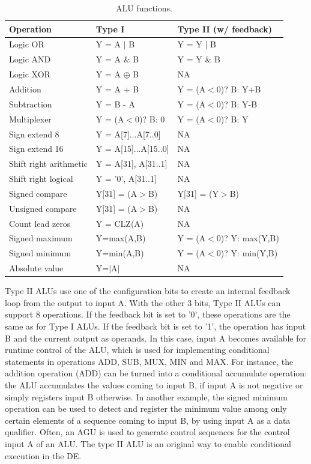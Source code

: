 \begin{table}[!htb]
  \renewcommand{\arraystretch}{1.2} %
  \caption{ALU functions.}
  \label{tab:AluOpers}
  \centering
  \begin{tabular}{lll}
    \toprule
    Operation              &                Type I & Type II (w/ feedback)\\
    \midrule
    Logic OR               &           Y = A $|$ B & Y = Y $|$ B\\
    Logic AND              &            Y = A \& B & Y = Y \& B\\
    Logic XOR              &      Y = A $\oplus$ B & NA\\
    Addition               &             Y = A + B & Y = (A$<$0)? B: Y+B\\
    Subtraction            &             Y = B - A & Y = (A$<$0)? B: Y-B\\
    Multiplexer            &     Y = (A$<$0)? B: 0 & Y = (A$<$0)? B: Y\\
    Sign extend 8          &    Y = A[7]...A[7..0] & NA\\
    Sign extend 16         &  Y = A[15]...A[15..0] & NA\\
    Shift right arithmetic & Y = {A[31], A[31..1]} & NA\\
    Shift right logical    &   Y = {'0', A[31..1]} & NA\\
    Signed compare         &       Y[31] = (A$>$B) & Y[31] = (Y$>$B)\\
    Unsigned compare       &       Y[31] = (A$>$B) & NA\\
    Count lead zeros       &            Y = CLZ(A) & NA\\
    Signed maximum         &            Y=max(A,B) & Y = (A$<$0)? Y: max(Y,B)\\
    Signed minimum         &            Y=min(A,B) & Y = (A$<$0)? Y: min(Y,B)\\
    Absolute value         &             Y=$|$A$|$ & NA\\
    \bottomrule
  \end{tabular}
\end{table}

Type II ALUs use one of the configuration bits to create an internal
feedback loop from the output to input A. With the other 3 bits, Type
II ALUs can support 8 operations. If the feedback bit is set to '0',
these operations are the same as for Type I ALUs. If the feedback bit
is set to '1', the operation has input B and the current output as
operands. In this case, input A becomes available for runtime control
of the ALU, which is used for implementing conditional statements in
operations ADD, SUB, MUX, MIN and MAX. For instance, the addition
operation (ADD) can be turned into a conditional accumulate operation:
the ALU accumulates the values coming to input B, if input A is not
negative or simply registers input B otherwise. In another example,
the signed minimum operation can be used to detect and register the
minimum value among only certain elements of a sequence coming to
input B, by using input A as a data qualifier. Often, an AGU is used
to generate control sequences for the control input A of an ALU. The
type II ALU is an original way to enable conditional execution in the
DE.

